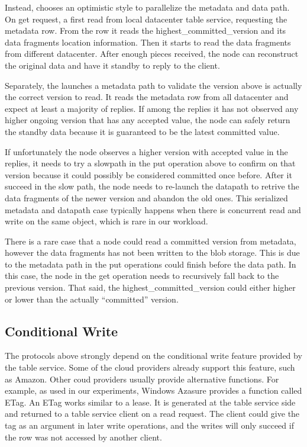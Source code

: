 Instead, {\name} chooses an optimistic style to parallelize the metadata and data path.
On get request, a {\name} first read from local datacenter table service, requesting
the metadata row. From the row it reads the highest\_committed\_version and its data
fragments location information. Then it starts to read the data fragments from different
datacenter. After enough pieces received, the {\name} node can reconstruct the original
data and have it standby to reply to the client.

Separately, the {\name} launches a metadata path to validate the version above is actually
the correct version to read. It reads the metadata row from all datacenter and expect
at least a majority of replies. If among the replies it has not observed any higher ongoing
version that has any accepted value, the {\name} node can safely return the standby
data because it is guaranteed to be the latest committed value.

If unfortunately the {\name} node observes a higher version with accepted value in the
replies, it needs to try a slowpath in the put operation above to confirm on that version
because it could possibly be considered committed once before. After it succeed in
the slow path, the {\name} node needs to re-launch the datapath to retrive the data
fragments of the newer version and abandon the old ones. This serialized metadata and
datapath case typically happens when there is concurrent read and write on the same
object, which is rare in our workload.


There is a rare case that a {\name} node could read a committed version from metadata,
however the data fragments has not been written to the blob storage. This is due to
the metadata path in the put operations could finish before the data path. In this case,
the {\name} node in the get operation needs to recursively fall back to the previous
version. That said, the highest\_committed\_version could either higher or lower than the actually
``committed'' version.
  
\subsection{Conditional Write}
The protocols above strongly depend on the conditional write feature provided by the
table service. Some of the cloud providers already support this feature, such as Amazon.
Other coud providers usually provide alternative functions. For example, as used in our
experiments, Windows Azasure provides a function called ETag. An ETag works similar to
a lease. It is generated at the table service side and returned to a table service client
on a read request. The client could give the tag as an argument in later write operations,
and the writes will only succeed if the row was not accessed by another client.

